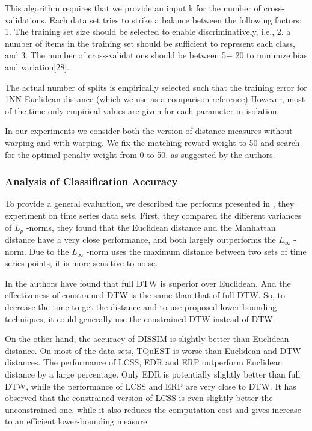 \documentclass{article}
\begin{document}
This algorithm requires that we provide an input k for the number of cross-validations.  Each data set tries to strike a balance between the following factors:  1. The training set size should be selected to enable discriminatively, i.e., 2. a number of items in the training set should be sufficient to represent each class, and 3. The number of cross-validations should be between 5− 20 to minimize bias and variation[28]. 

The actual number of splits is empirically selected such that the training error for 1NN Euclidean distance (which we use as a comparison reference) However, most of the time only empirical values are given for each parameter in isolation. 

In our experiments we consider both the version of distance measures without warping and with warping.  We fix the matching reward weight to 50 and search for the optimal penalty weight from 0 to 50, as suggested by the authors.







\subsubsection{Analysis of Classification Accuracy}
To provide a general evaluation, we described the performs presented in \cite{ding2008querying}, they experiment on time series data sets. First, they compared the different variances of $L_p$ -norms, they found that the Euclidean distance and the Manhattan distance have a very close performance, and both largely outperforms the $L_{\infty}$ -norm. Due to the $L_{\infty}$ -norm uses the maximum distance between two sets of time series points, it is more sensitive to noise.

In \cite{ding2008querying} the authors have found that full DTW is superior over Euclidean. And the effectiveness of constrained DTW is the same than that of full DTW. So, to decrease the time to get the distance and to use proposed lower bounding techniques, it could generally use the constrained DTW instead of DTW. 

On the other hand, the accuracy of DISSIM is slightly better than Euclidean distance. On most of the data sets, TQuEST is worse than Euclidean and DTW distances. The performance of LCSS, EDR and ERP outperform Euclidean distance by a large percentage. Only EDR is potentially slightly better than full DTW, while the performance of LCSS and ERP are very close to DTW. It has observed that the constrained version of LCSS is even slightly better the unconstrained one, while it also reduces the computation cost and gives increase to an efficient lower-bounding measure.
\end{document}

